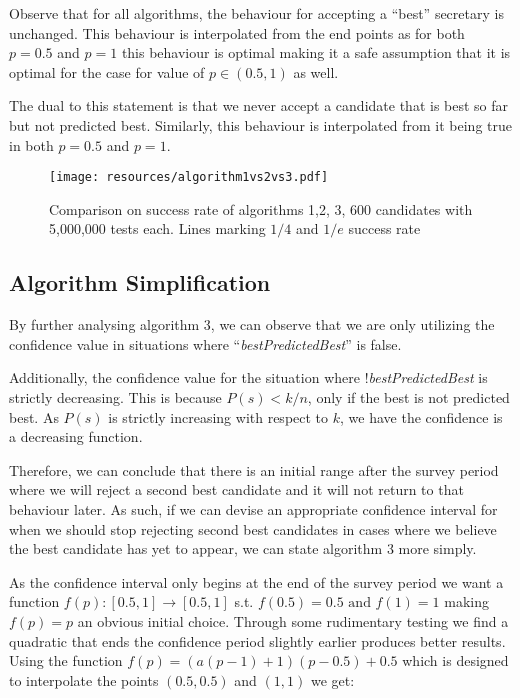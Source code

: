 \documentclass[a4paper,11pt]{article}
\begin{document}
Observe that for all algorithms, the behaviour for accepting a ``best'' secretary is unchanged. This behaviour is interpolated from the end points as for both $p = 0.5$ and $p = 1$ this behaviour is optimal making it a safe assumption that it is optimal for the case for value of $p \in (0.5,1)$ as well.

The dual to this statement is that we never accept a candidate that is best so far but not predicted best. Similarly, this behaviour is interpolated from it being true in both $p=0.5$ and $p=1$.
\begin{figure}[H]
    \centering
    \texttt{[image: resources/algorithm1vs2vs3.pdf]}
    \caption{Comparison on success rate of algorithms 1,2, 3, 600 candidates with 5,000,000 tests each. Lines marking $1/4$ and $1/e$ success rate}
    \label{fig:algorithms123}
\end{figure}


\subsection{Algorithm Simplification}
\label{assumption2}
By further analysing algorithm 3, we can observe that we are only utilizing the confidence value in situations where ``\textit{bestPredictedBest}'' is false. 

Additionally, the confidence value for the situation where !\textit{bestPredictedBest} is strictly decreasing. This is because $P(s) < k/n$, only if the best is not predicted best. As $P(s)$ is strictly increasing with respect to $k$, we have the confidence is a decreasing function. 

Therefore, we can conclude that there is an initial range after the survey period where we will reject a second best candidate and it will not return to that behaviour later. As such, if we can devise an appropriate confidence interval for when we should stop rejecting second best candidates in cases where we believe the best candidate has yet to appear, we can state algorithm 3 more simply.

As the confidence interval only begins at the end of the survey period we want a function $f(p):[0.5,1] \rightarrow [0.5,1]$ s.t. $f(0.5) = 0.5 \text{ and } f(1) = 1$ making $f(p) = p$ an obvious initial choice. Through some rudimentary testing we find a quadratic that ends the confidence period slightly earlier produces better results. Using the function $f(p)=\left(a\left(p-1\right)+1\right)\left(p-0.5\right)+0.5$ which is designed to interpolate the points $(0.5,0.5)$ and $(1,1)$ we get:
\end{document}
